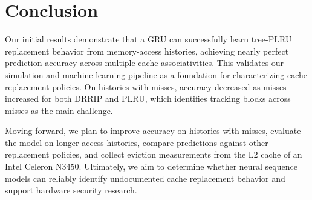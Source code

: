 \section{Conclusion}
Our initial results demonstrate that a GRU can successfully
learn tree-PLRU replacement behavior from memory-access
histories, achieving nearly perfect prediction accuracy
across multiple cache associativities. This validates our
simulation and machine-learning pipeline as a foundation
for characterizing cache replacement policies. On histories
with misses, accuracy decreased as misses increased for both
DRRIP and PLRU, which identifies tracking blocks across
misses as the main challenge.

Moving forward, we plan to improve accuracy on histories
with misses, evaluate the model on longer access histories, compare
predictions against other replacement policies, and collect
eviction measurements from the L2 cache of an Intel Celeron
N3450. Ultimately,
we aim to determine whether neural sequence models can
reliably identify undocumented cache replacement behavior
and support hardware security research.
